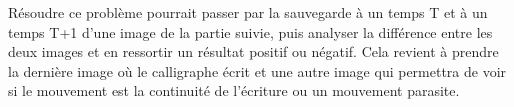 Résoudre ce problème pourrait passer par la sauvegarde à un temps T et à un temps T+1 d'une image de la partie suivie, puis analyser la différence entre les deux images et en ressortir un résultat positif ou négatif. Cela revient à prendre la dernière image où le calligraphe écrit et une autre image qui permettra de voir si le mouvement est la continuité de l'écriture ou un mouvement parasite.